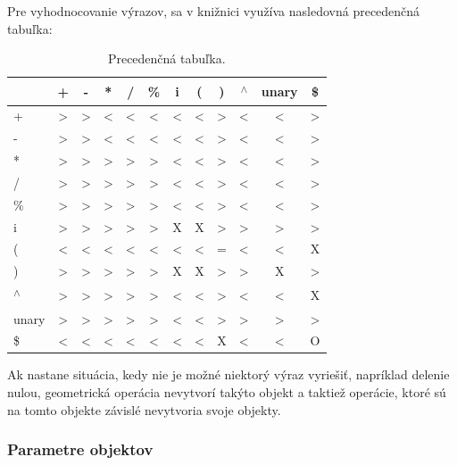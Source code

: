 Pre vyhodnocovanie výrazov, sa v knižnici využíva nasledovná precedenčná tabuľka: 
\begin{table}[H]
\centering
\begin{tabular}{ |m{1cm}||c c c c c c c c c c c |}
\hline
&+ & - & * & / & \% & i & ( & ) & \textsuperscript{$\wedge$} & unary & \$   \\
\hline
\hline
+ & > & > & < & < & < & < & < & > & < & < & >          \\
- & > & > & < & < & < & < & < & > & < & < & >          \\
* & > & > & > & > & > & < & < & > & < & < & >          \\
/ & > & > & > & > & > & < & < & > & < & < & >          \\
\% & > & > & > & > & > & < & < & > & < & < & >          \\
i & > & > & > & > & > & X & X & > & > & > & >          \\
( & < & < & < & < & < & < & < & = & < & < & X          \\
) & > & > & > & > & > & X & X & > & > & X & >          \\
\textsuperscript{$\wedge$} & > & > & > & > & > & < & < & > & < & < & X \\
unary & > & > & > & > & > & < & < & > & > & > & >      \\
\$ & < & < & < & < & < & < & < & X & < & < & O          \\
\hline
\end{tabular}
\caption{\label{tab:precedenceTable}Precedenčná tabuľka.}
\end{table}


Ak nastane situácia, kedy nie je možné niektorý výraz vyriešiť, napríklad delenie nulou, geometrická operácia nevytvorí takýto objekt a taktiež operácie, ktoré sú na tomto objekte závislé nevytvoria svoje objekty.

\subsubsection*{Parametre objektov}





